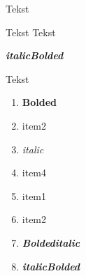 \documentclass{report}
\begin{document}
    Tekst

    Tekst
    Tekst

    \textit{\textbf{italicBolded}} 

    Tekst
    \begin{enumerate}
        \item \textbf{Bolded}
        \item item2
        \item \textit{italic}
        \item item4
        \item item1
        \item item2
        \item \textbf{\textit{Boldeditalic}}
        \item \textit{\textbf{italicBolded}}
    \end{enumerate}
\end{document}
